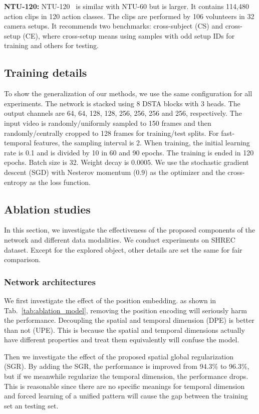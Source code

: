 \documentclass[runningheads]{llncs}
\begin{document}
\textbf{NTU-120:} NTU-120~\cite{shahroudy_ntu_2016} is similar with NTU-60 but is larger. It contains 114,480 action clips in 120 action classes. The clips are performed by 106 volunteers in 32 camera setups. It recommends two benchmarks: cross-subject (CS) and cross-setup (CE), where cross-setup means using samples with odd setup IDs for training and others for testing. 

\subsection{Training details}
To show the generalization of our methods, we use the same configuration for all experiments. 
The network is stacked using 8 DSTA blocks with 3 heads. The output channels are 64, 64, 128, 128, 256, 256, 256 and 256, respectively. 
The input video is randomly/uniformly sampled to 150 frames and then randomly/centrally cropped to 128 frames for training/test splits. 
For fast-temporal features, the sampling interval is 2. 
When training, the initial learning rate is 0.1 and is divided by 10 in 60 and 90 epochs. 
The training is ended in 120 epochs. 
Batch size is 32. Weight decay is $0.0005$. 
We use the stochastic gradient descent (SGD) with Nesterov momentum ($0.9$) as the optimizer and the cross-entropy as the loss function. 


\subsection{Ablation studies}
\label{sec:ablation}
In this section, we investigate the effectiveness of the proposed components of the network and different data modalities. 
We conduct experiments on SHREC dataset. 
Except for the explored object, other details are set the same for fair comparison. 

\subsubsection{Network architectures}
We first investigate the effect of the position embedding. 
as shown in Tab.~\ref{tab:ablation_model}, removing the position encoding will seriously harm the performance. Decoupling the spatial and temporal dimension (DPE) is better than not (UPE). 
This is because the spatial and temporal dimensions actually have different properties and treat them equivalently will confuse the model.

Then we investigate the effect of the proposed spatial global regularization (SGR). 
By adding the SGR, the performance is improved from 94.3\% to 96.3\%, but if we meanwhile regularize the temporal dimension, the performance drops. 
This is reasonable since there are no specific meanings for temporal dimension and forced learning of a unified pattern will cause the gap between the training set an testing set. 
\end{document}
